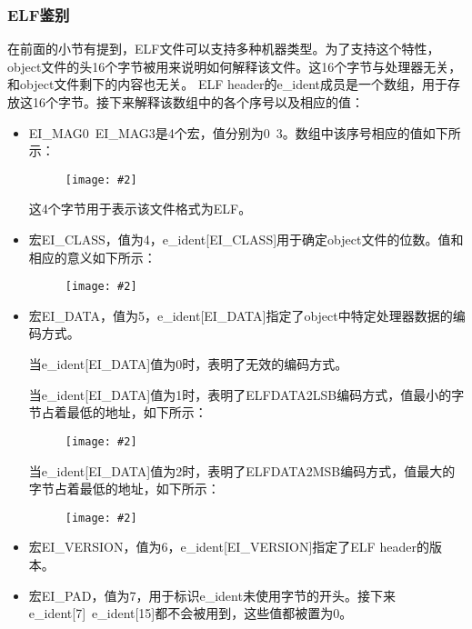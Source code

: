 \documentclass[a4paper,left=2.5cm,right=2.5cm,11pt]{article}
\newcommand{\sizedfic}[2]{\begin{figure}[H]
		\center
		\texttt{[image: \#2]}
	\end{figure}}
\begin{document}
\subsubsection{ELF鉴别}
	在前面的小节有提到，ELF文件可以支持多种机器类型。为了支持这个特性，object文件的头16个字节被用来说明如何解释该文件。这16个字节与处理器无关，和object文件剩下的内容也无关。
	ELF header的e\_ident成员是一个数组，用于存放这16个字节。接下来解释该数组中的各个序号以及相应的值：
	\begin{itemize}
		\item EI\_MAG0~EI\_MAG3是4个宏，值分别为0~3。数组中该序号相应的值如下所示：
		\sizedfic{0.5}{12.png}

		这4个字节用于表示该文件格式为ELF。

		\item 宏EI\_CLASS，值为4，e\_ident[EI\_CLASS]用于确定object文件的位数。值和相应的意义如下所示：
		\sizedfic{0.5}{13.png}

		\item 宏EI\_DATA，值为5，e\_ident[EI\_DATA]指定了object中特定处理器数据的编码方式。\par
			当e\_ident[EI\_DATA]值为0时，表明了无效的编码方式。\par
			当e\_ident[EI\_DATA]值为1时，表明了ELFDATA2LSB编码方式，值最小的字节占着最低的地址，如下所示：
			\sizedfic{0.7}{14.png}

			当e\_ident[EI\_DATA]值为2时，表明了ELFDATA2MSB编码方式，值最大的字节占着最低的地址，如下所示：
			\sizedfic{0.7}{15.png}

		\item 宏EI\_VERSION，值为6，e\_ident[EI\_VERSION]指定了ELF header的版本。
		\item 宏EI\_PAD，值为7，用于标识e\_ident未使用字节的开头。接下来e\_ident[7]~e\_ident[15]都不会被用到，这些值都被置为0。
	\end{itemize}

\end{document}
